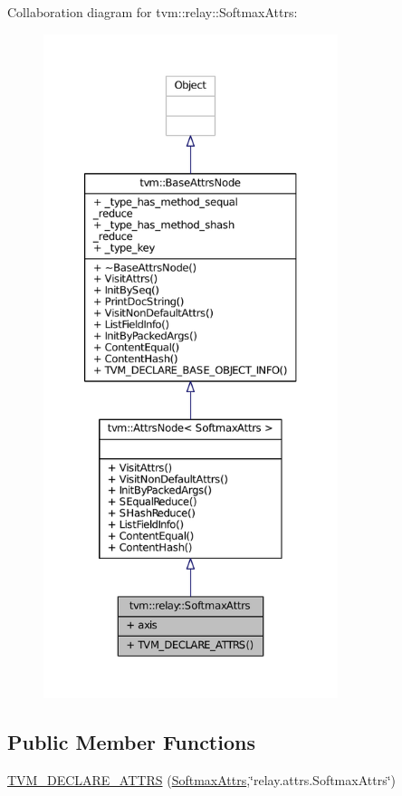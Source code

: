 Collaboration diagram for tvm\+:\+:relay\+:\+:Softmax\+Attrs\+:
\nopagebreak
\begin{figure}[H]
\begin{center}
\leavevmode
\includegraphics[height=550pt]{structtvm_1_1relay_1_1SoftmaxAttrs__coll__graph}
\end{center}
\end{figure}
\subsection*{Public Member Functions}
\begin{DoxyCompactItemize}
\item 
\hyperlink{structtvm_1_1relay_1_1SoftmaxAttrs_aa97df0d3797e9335fb68433e32f53802}{T\+V\+M\+\_\+\+D\+E\+C\+L\+A\+R\+E\+\_\+\+A\+T\+T\+RS} (\hyperlink{structtvm_1_1relay_1_1SoftmaxAttrs}{Softmax\+Attrs},\char`\"{}relay.\+attrs.\+Softmax\+Attrs\char`\"{})
\end{DoxyCompactItemize}
